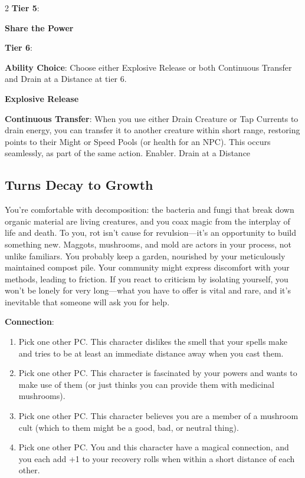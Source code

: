 \begin{multicols}{2}
\textbf{Tier 5}:

\textbf{Share the Power} 

\textbf{Tier 6}:

\textbf{Ability Choice}: Choose either Explosive Release or both Continuous Transfer and Drain at a Distance at tier 6.

\textbf{Explosive Release}

\textbf{Continuous Transfer}: When you use either Drain Creature or Tap Currents to drain energy, you can transfer it to another creature within short range, restoring points to their Might or Speed Pools (or health for an NPC). This occurs seamlessly, as part of the same action. Enabler.
Drain at a Distance

\subsection{Turns Decay to Growth} 

You’re comfortable with decomposition: the bacteria and fungi that break down organic material are living creatures, and you coax magic from the interplay of life and death. To you, rot isn’t cause for revulsion—it’s an opportunity to build something new. Maggots, mushrooms, and mold are actors in your process, not unlike familiars. You probably keep a garden, nourished by your meticulously maintained compost pile. Your community might express discomfort with your methods, leading to friction. If you react to criticism by isolating yourself, you won’t be lonely for very long—what you have to offer is vital and rare, and it’s inevitable that someone will ask you for help.

\textbf{Connection}: 
\begin{enumerate}
\item Pick one other PC. This character dislikes the smell that your spells make and tries to be at least an immediate distance away when you cast them.
\item Pick one other PC. This character is fascinated by your powers and wants to make use of them (or just thinks you can provide them with medicinal mushrooms).
\item Pick one other PC. This character believes you are a member of a mushroom cult (which to them might be a good, bad, or neutral thing).
\item Pick one other PC. You and this character have a magical connection, and you each add +1 to your recovery rolls when within a short distance of each other.
\end{enumerate}


\end{multicols}
